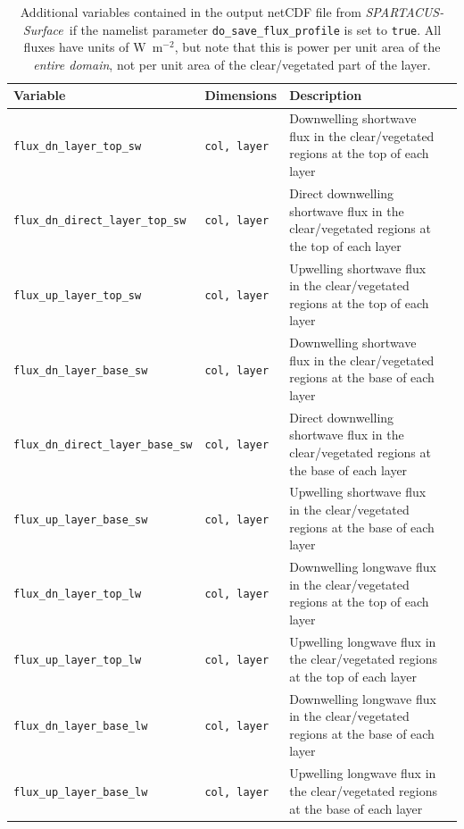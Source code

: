 \documentclass[a4,oneside]{article}
\def\tablesetup{\rowcolors{2}{light-gray}{light-gray}\small}
\def\codesize{\small}
\def\codetabsize{\footnotesize}
\def\spsurf{\emph{SPARTACUS-Surface}}
\def\code#1{{\codesize\texttt{#1}}}
\def\codetab#1{{\codetabsize\texttt{#1}}}
\begin{document}
\begin{center}
\tablesetup
\begin{longtable}{llLp{7cm}}%
\caption{\label{tab:outfluxprofvar}Additional variables contained in the
  output netCDF file from \spsurf\ if the namelist parameter
  \code{do\_save\_flux\_profile} is set to \code{true}.  All fluxes
  have units of W~m$^{-2}$, but
  note that this is power per unit area of the \emph{entire domain},
  not per unit area of the clear/vegetated part of the layer.}\\
%
\hline
Variable & Dimensions & Description\\
\hline
\codetab{flux\_dn\_layer\_top\_sw} & \codetab{col, layer} & Downwelling shortwave flux in the clear/vegetated regions at the top of each layer\\
\codetab{flux\_dn\_direct\_layer\_top\_sw} & \codetab{col, layer} & Direct downwelling shortwave flux in the clear/vegetated regions at the top of each layer\\
\codetab{flux\_up\_layer\_top\_sw} & \codetab{col, layer} & Upwelling shortwave flux in the clear/vegetated regions at the top of each layer\\
\codetab{flux\_dn\_layer\_base\_sw} & \codetab{col, layer} & Downwelling shortwave flux in the clear/vegetated regions at the base of each layer\\
\codetab{flux\_dn\_direct\_layer\_base\_sw} & \codetab{col, layer} & Direct downwelling shortwave flux in the clear/vegetated regions at the base of each layer\\
\codetab{flux\_up\_layer\_base\_sw} & \codetab{col, layer} & Upwelling shortwave flux in the clear/vegetated regions at the base of each layer\\
\codetab{flux\_dn\_layer\_top\_lw} & \codetab{col, layer} & Downwelling longwave flux in the clear/vegetated regions at the top of each layer\\
\codetab{flux\_up\_layer\_top\_lw} & \codetab{col, layer} & Upwelling longwave flux in the clear/vegetated regions at the top of each layer\\
\codetab{flux\_dn\_layer\_base\_lw} & \codetab{col, layer} & Downwelling longwave flux in the clear/vegetated regions at the base of each layer\\
\codetab{flux\_up\_layer\_base\_lw} & \codetab{col, layer} & Upwelling longwave flux in the clear/vegetated regions at the base of each layer\\
\hline
\end{longtable}
\end{center}
\end{document}
